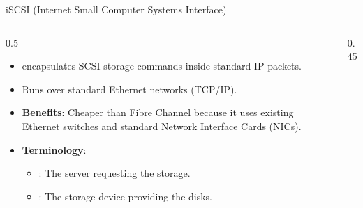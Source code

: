 \documentclass[aspectratio=169]{beamer}  %
\begin{document}
\begin{frame}[t]{iSCSI (Internet Small Computer Systems Interface)}
    \begin{columns}[T]
        \begin{column}{0.5\textwidth}
            \begin{itemize}
                \item {} encapsulates SCSI storage commands inside standard IP packets.
                \item Runs over standard Ethernet networks (TCP/IP).
                \item \textbf{Benefits}: Cheaper than Fibre Channel because it uses existing Ethernet switches and standard Network Interface Cards (NICs).
                \item \textbf{Terminology}:
                \begin{itemize}
                    \footnotesize
                    \item {}: The server requesting the storage.
                    \item {}: The storage device providing the disks.
                \end{itemize}
            \end{itemize}
        \end{column}
        \begin{column}{0.45\textwidth}
            \begin{center}
            \end{center}
        \end{column}
    \end{columns}
\end{frame}
\end{document}
